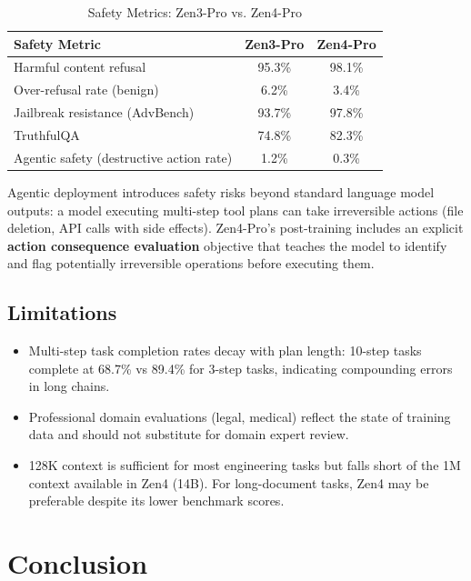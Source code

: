 \documentclass[11pt,a4paper]{article}
\begin{document}
\begin{table}[H]
\centering
\begin{tabular}{lcc}
\toprule
\textbf{Safety Metric} & \textbf{Zen3-Pro} & \textbf{Zen4-Pro} \\
\midrule
Harmful content refusal        & 95.3\% & 98.1\% \\
Over-refusal rate (benign)     & 6.2\%  & 3.4\%  \\
Jailbreak resistance (AdvBench)& 93.7\% & 97.8\% \\
TruthfulQA                     & 74.8\% & 82.3\% \\
Agentic safety (destructive action rate) & 1.2\% & 0.3\% \\
\bottomrule
\end{tabular}
\caption{Safety Metrics: Zen3-Pro vs. Zen4-Pro}
\end{table}

Agentic deployment introduces safety risks beyond standard language model outputs: a model
executing multi-step tool plans can take irreversible actions (file deletion, API calls with
side effects). Zen4-Pro's post-training includes an explicit \textbf{action consequence
evaluation} objective that teaches the model to identify and flag potentially irreversible
operations before executing them.

\subsection{Limitations}

\begin{itemize}
    \item Multi-step task completion rates decay with plan length: 10-step tasks complete
    at 68.7\% vs 89.4\% for 3-step tasks, indicating compounding errors in long chains.
    \item Professional domain evaluations (legal, medical) reflect the state of training
    data and should not substitute for domain expert review.
    \item 128K context is sufficient for most engineering tasks but falls short of the
    1M context available in Zen4 (14B). For long-document tasks, Zen4 may be preferable
    despite its lower benchmark scores.
\end{itemize}

\section{Conclusion}
\end{document}

